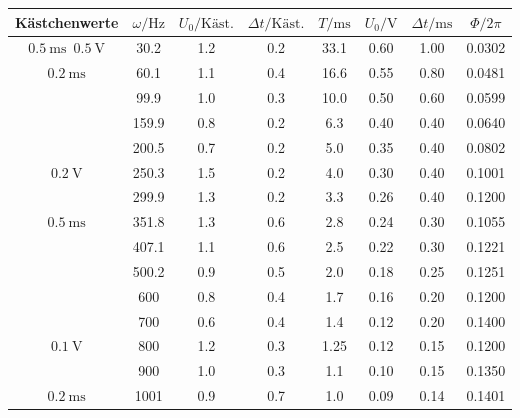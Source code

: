 \begin{table}
    \centering
    \begin{tabular}{
        c
        S[table-format=3.1]
        S
        S
        S[table-format=2.2]
        S[table-format=1.2]
        S[table-format=1.2]
        S[table-format=1.4]
    }
    \toprule
    {Kästchenwerte} & 
    {$\omega / \unit{\hertz}$} &
    {$U_0 / \text{Käst.}$} &
    {$\Delta t / \text{Käst.}$} &
    {$T / \unit{\milli\s}$} &
    {$U_0 / \unit{\volt} $} & 
    {$\Delta t / \unit{\milli\s}$} &
    {$\Phi / 2 \pi$}\\
    \midrule
           
    $\qty{0.5}{\milli\s}$\, $\qty{0.5}{\volt} $ & 30.2  & 1.2 & 0.2  & 33.1 & 0.60 & 1.00 & 0.0302 \\
    $\qty{0.2}{\milli\s}$                       & 60.1  & 1.1 & 0.4  & 16.6 & 0.55 & 0.80 & 0.0481 \\
                                                & 99.9  & 1.0 & 0.3  & 10.0 & 0.50 & 0.60 & 0.0599 \\
                                                & 159.9 & 0.8 & 0.2  & 6.3  & 0.40 & 0.40 & 0.0640 \\
                                                & 200.5 & 0.7 & 0.2  & 5.0  & 0.35 & 0.40 & 0.0802 \\
    $\qty{0.2}{\volt}$                          & 250.3 & 1.5 & 0.2  & 4.0  & 0.30 & 0.40 & 0.1001 \\
                                                & 299.9 & 1.3 & 0.2  & 3.3  & 0.26 & 0.40 & 0.1200 \\
    $\qty{0.5}{\milli\s}$                       & 351.8 & 1.3 & 0.6  & 2.8  & 0.24 & 0.30 & 0.1055 \\
                                                & 407.1 & 1.1 & 0.6  & 2.5  & 0.22 & 0.30 & 0.1221 \\
                                                & 500.2 & 0.9 & 0.5  & 2.0  & 0.18 & 0.25 & 0.1251 \\
                                                & 600   & 0.8 & 0.4  & 1.7  & 0.16 & 0.20 & 0.1200 \\
                                                & 700   & 0.6 & 0.4  & 1.4  & 0.12 & 0.20 & 0.1400 \\
    $\qty{0.1}{\volt}$                          & 800   & 1.2 & 0.3  & 1.25 & 0.12 & 0.15 & 0.1200 \\
                                                & 900   & 1.0 & 0.3  & 1.1  & 0.10 & 0.15 & 0.1350 \\
    $\qty{0.2}{\milli\s}$                       & 1001  & 0.9 & 0.7  & 1.0  & 0.09 & 0.14 & 0.1401 \\
    \bottomrule
    \end{tabular}
\end{table}